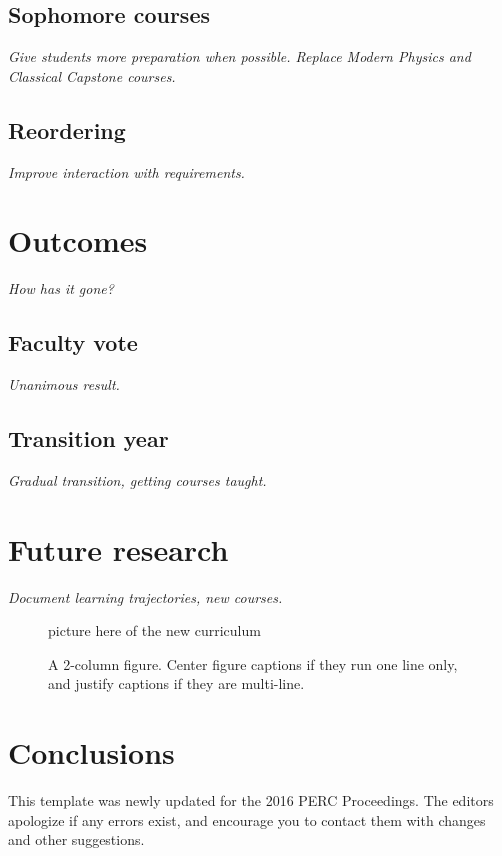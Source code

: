 \documentclass[english,aps,pra,reprint,noshowpacs,superscriptaddress]{revtex4-1}
\begin{document}
\subsection{Sophomore courses}
\emph{Give students more preparation when possible.  Replace Modern
  Physics and Classical Capstone courses.}
\subsection{Reordering}
\emph{Improve interaction with requirements.}

\section{Outcomes}
\emph{How has it gone?}

\subsection{Faculty vote}
\emph{Unanimous result.}
\subsection{Transition year}
\emph{Gradual transition, getting courses taught.}

\section{Future research}
\emph{Document learning trajectories, new courses.}


\begin{figure}
  picture here of the new curriculum
\caption{A 2-column figure. Center figure captions if they run one
  line only, and justify captions if they are multi-line.\label{fig2}}
\end{figure}



\section{Conclusions}
This template was newly updated for the 2016 PERC Proceedings.  The
editors apologize if any errors exist, and encourage you to contact
them with changes and other suggestions.  


\end{document}
